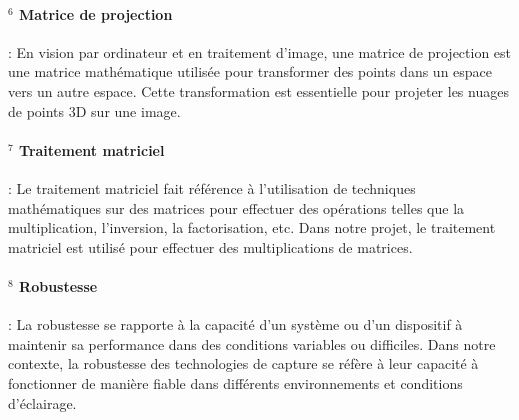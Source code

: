 \paragraph{$^6$ Matrice de projection\label{def:matric_proj}}: En vision par ordinateur et en traitement d'image, une matrice de projection est une matrice mathématique utilisée pour transformer des points dans un espace vers un autre espace. Cette transformation est essentielle pour projeter les nuages de points 3D sur une image.

\paragraph{$^7$ Traitement matriciel\label{def:traitement_matriciel}}: Le traitement matriciel fait référence à l'utilisation de techniques mathématiques sur des matrices pour effectuer des opérations telles que la multiplication, l'inversion, la factorisation, etc. Dans notre projet, le traitement matriciel est utilisé pour effectuer des multiplications de matrices.

\paragraph{$^8$ Robustesse\label{def:robustesse}}:  La robustesse se rapporte à la capacité d'un système ou d'un dispositif à maintenir sa performance dans des conditions variables ou difficiles. Dans notre contexte, la robustesse des technologies de capture se réfère à leur capacité à fonctionner de manière fiable dans différents environnements et conditions d'éclairage.  

\clearpage